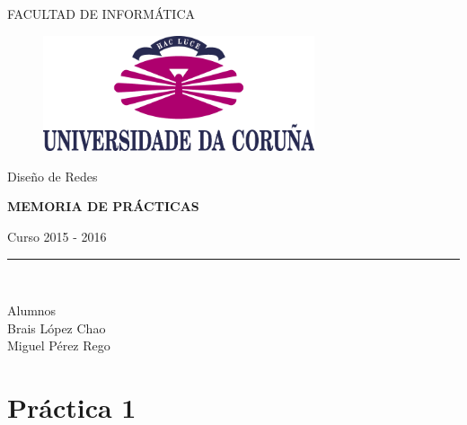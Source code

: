 \documentclass{article}
\begin{document}
	
	\begin{titlepage}
		
		\begin{center}
			\vspace*{0.1in}

			
			FACULTAD DE INFORMÁTICA\\
			\vspace*{0.55in}
				
			\begin{figure}[htb]
							\begin{center}
								\includegraphics[width=8cm]{./logo.png}
							\end{center}
			\end{figure}
			\vspace*{0.8in}
			\large Diseño de Redes\\
			\vspace*{0.4in}
			\begin{Large}
				\textbf{MEMORIA DE PRÁCTICAS} \\
			\end{Large}
			\vspace*{2.5in}
			\begin{large}
				Curso 2015 - 2016\\
			\end{large}
			\rule{80mm}{0.1mm}\\
			
			\begin{large}
				Alumnos \\
				Brais López Chao\\
				Miguel Pérez Rego\\
			\end{large}
		\end{center}
		
	\end{titlepage}

	
	\tableofcontents
	\newpage
	
	\section{Práctica 1}
	
\end{document}
